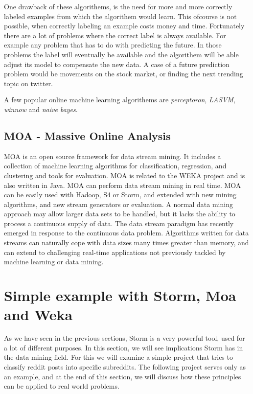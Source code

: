 \documentclass[journal]{IEEEtran/IEEEtran}
\begin{document}
One drawback of these algorithems, is the need for more and more correctly labeled examples from which the algorithem would learn. This ofcourse is not possible, when correctly labeling an example costs money and time. Fortunately there are a lot of problems where the correct label is always available. For example any problem that has to do with predicting the future. In those problems the label will eventually be available and the algorithem will be able adjust its model to compensate the new data. A case of a future prediction problem would be movements on the stock market, or finding the next trending topic on twitter.

A few popular online machine learning algorithems are \textit{perceptoron}, \textit{LASVM}, \textit{winnow} and \textit{naive bayes}. 



\subsection{MOA - Massive Online Analysis}

MOA is an open source framework for data stream mining. It includes a collection of machine learning algorithms for classification, regression, and clustering and tools for evaluation. MOA is related to the WEKA project and is also written in Java. MOA can perform data stream mining in real time. MOA can be easily used with Hadoop, S4 or Storm, and extended with new mining algorithms, and new stream generators or evaluation. A normal data mining approach may allow larger data sets to be handled, but it lacks the ability to process a continuous supply of data. The data stream paradigm has recently emerged in response to the continuous data problem. Algorithms written for data streams can naturally cope with data sizes many times greater than memory, and can extend to challenging real-time applications not previously tackled by machine learning or data mining.

\section{Simple example with Storm, Moa and Weka}

As we have seen in the previous sections, Storm is a very powerful tool, used for a lot of different purposes. In this section, we will see implications Storm has in the data mining field. For this we will examine a simple project that tries to classify reddit posts into specific subreddits. The following project serves only as an example, and at the end of this section, we will discuss how these principles can be applied to real world problems.
\end{document}
